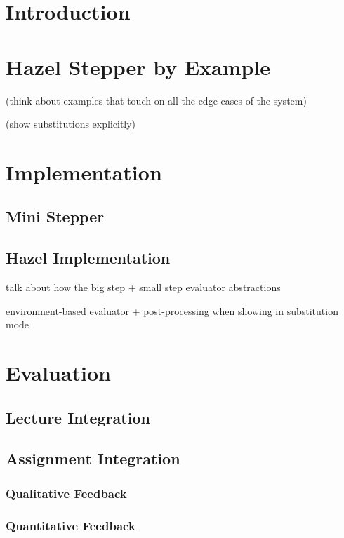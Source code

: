 \documentclass[acmsmall,anonymous]{acmart}
\begin{document}
\section{Introduction}



\section{Hazel Stepper by Example}



(think about examples that touch on all the edge cases of the system)

(show substitutions explicitly)



\section{Implementation}

\subsection{Mini Stepper}

\subsection{Hazel Implementation}

talk about how the big step + small step evaluator abstractions

environment-based evaluator + post-processing when showing in substitution mode

\section{Evaluation}

\subsection{Lecture Integration}

\subsection{Assignment Integration}
\subsubsection{Qualitative Feedback}
\subsubsection{Quantitative Feedback}
\end{document}
